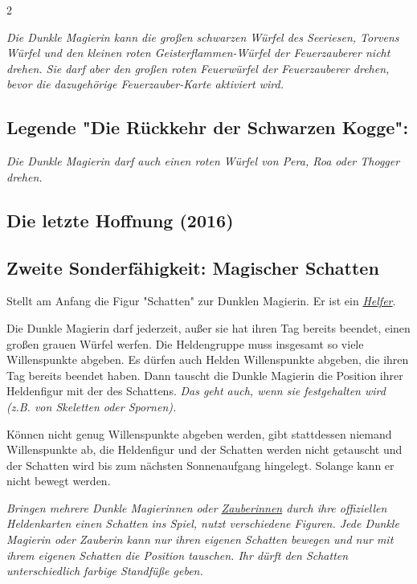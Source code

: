 \documentclass[10pt, a4paper, oneside]{book}
\newcommand{\fan}[1]{\textit{#1}}
\begin{document}
\begin{multicols*}{2}
\begin{bgcolor}
\fan{Die Dunkle Magierin kann die großen schwarzen Würfel des Seeriesen, Torvens Würfel und den kleinen roten Geisterflammen-Würfel der Feuerzauberer nicht drehen. Sie darf aber den großen roten Feuerwürfel der Feuerzauberer drehen, bevor die dazugehörige Feuerzauber-Karte aktiviert wird.}




\subsection{Legende "Die Rückkehr der Schwarzen Kogge":}

\fan{Die Dunkle Magierin darf auch einen roten Würfel von Pera, Roa oder Thogger drehen.}

\end{bgcolor}




\begin{bgcolor}
\section{Die letzte Hoffnung (2016)}

\subsection{Zweite Sonderfähigkeit: Magischer Schatten}

Stellt am Anfang die Figur "Schatten" zur Dunklen Magierin. Er ist ein \hyperref[helfer]{\fan{Helfer}}.

Die Dunkle Magierin darf jederzeit, außer sie hat ihren Tag bereits beendet, einen großen grauen Würfel werfen. Die Heldengruppe muss insgesamt so viele Willenspunkte abgeben. Es dürfen auch Helden Willenspunkte abgeben, die ihren Tag bereits beendet haben. Dann tauscht die Dunkle Magierin die Position ihrer Heldenfigur mit der des Schattens. \fan{Das geht auch, wenn sie festgehalten wird (z.B. von Skeletten oder Spornen).}
 

Können nicht genug Willenspunkte abgeben werden, gibt stattdessen niemand Willenspunkte ab, die Heldenfigur und der Schatten werden nicht getauscht und der Schatten wird bis zum nächsten Sonnenaufgang hingelegt. Solange kann er nicht bewegt werden.
\supercite{dunkle-eara-regelkarte,dunkle-eara-heldenkarte}


\fan{Bringen mehrere Dunkle Magierinnen oder \hyperref[zauberin]{Zauberinnen} durch ihre offiziellen Heldenkarten einen Schatten ins Spiel, nutzt verschiedene Figuren. Jede Dunkle Magierin oder Zauberin kann nur ihren eigenen Schatten bewegen und nur mit ihrem eigenen Schatten die Position tauschen. Ihr dürft den Schatten unterschiedlich farbige Standfüße geben.}





\end{bgcolor}
\end{multicols*}
\end{document}
